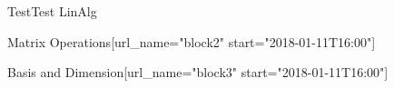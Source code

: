 \documentclass[12pt]{article}
\begin{document}
\begin{edXcourse}{Test}{Test LinAlg}
\begin{edXchapter}{Matrix Operations}[url_name="block2" start="2018-01-11T16:00"]







\endedxsequential

\def\edxbaseoutputname{b2leontief}











\endedxsequential


\end{edXchapter}



\begin{edXchapter}{Basis and Dimension}[url_name="block3" start="2018-01-11T16:00"]

\def\edxbaseoutputname{b3subspaces}







% 




\endedxsequential




\end{edXchapter}

\end{edXcourse}
\end{document}
